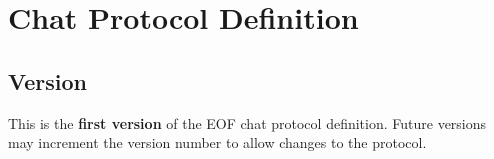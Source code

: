 \chapter{Chat Protocol Definition}
\label{protocol}
\section{Version}
This is the \textbf{first version} of the EOF chat protocol definition.
Future versions may increment the version number to allow changes to the
protocol.

